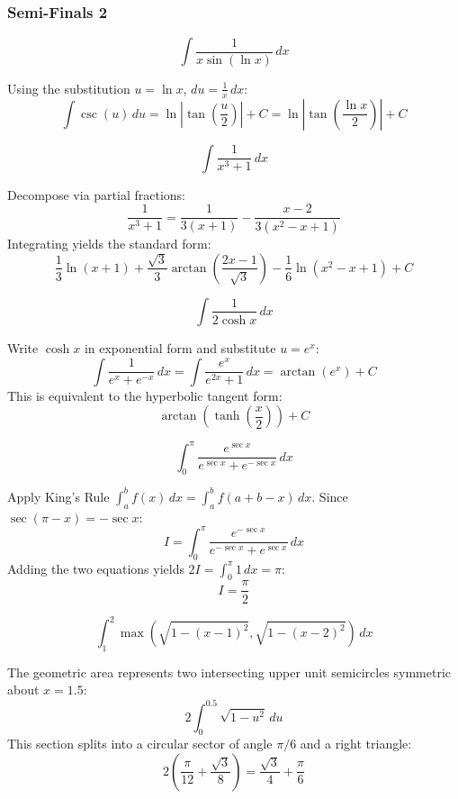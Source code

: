 \subsubsection*{Semi-Finals 2}
\begin{questions}

\question
\[ \int \frac{1}{x \sin(\ln x)} \,dx \]
\begin{solution}
Using the substitution $u = \ln x$, $du = \frac{1}{x} \,dx$:
\[ \int \csc(u) \,du = \ln\left|\tan\left(\frac{u}{2}\right)\right| + C = \ln\left|\tan\left(\frac{\ln x}{2}\right)\right| + C \]
\end{solution}

\question
\[ \int \frac{1}{x^3+1} \,dx \]
\begin{solution}
Decompose via partial fractions:
\[ \frac{1}{x^3+1} = \frac{1}{3(x+1)} - \frac{x-2}{3(x^2-x+1)} \]
Integrating yields the standard form:
\[ \frac{1}{3}\ln(x+1) + \frac{\sqrt{3}}{3}\arctan\left(\frac{2x-1}{\sqrt{3}}\right) - \frac{1}{6}\ln(x^2-x+1) + C \]
\end{solution}

\question
\[ \int \frac{1}{2\cosh x} \,dx \]
\begin{solution}
Write $\cosh x$ in exponential form and substitute $u = e^x$:
\[ \int \frac{1}{e^x + e^{-x}} \,dx = \int \frac{e^x}{e^{2x} + 1} \,dx = \arctan(e^x) + C \]
This is equivalent to the hyperbolic tangent form:
\[ \arctan\left(\tanh\left(\frac{x}{2}\right)\right) + C \]
\end{solution}

\question
\[ \int_0^\pi \frac{e^{\sec x}}{e^{\sec x} + e^{-\sec x}} \,dx \]
\begin{solution}
Apply King's Rule $\int_a^b f(x) \,dx = \int_a^b f(a+b-x) \,dx$. Since $\sec(\pi - x) = -\sec x$:
\[ I = \int_0^\pi \frac{e^{-\sec x}}{e^{-\sec x} + e^{\sec x}} \,dx \]
Adding the two equations yields $2I = \int_0^\pi 1 \,dx = \pi$:
\[ I = \frac{\pi}{2} \]
\end{solution}

\question
\[ \int_1^2 \max\left(\sqrt{1-(x-1)^2}, \sqrt{1-(x-2)^2}\right) \,dx \]
\begin{solution}
The geometric area represents two intersecting upper unit semicircles symmetric about $x = 1.5$:
\[ 2 \int_0^{0.5} \sqrt{1-u^2} \,du \]
This section splits into a circular sector of angle $\pi/6$ and a right triangle:
\[ 2 \left( \frac{\pi}{12} + \frac{\sqrt{3}}{8} \right) = \frac{\sqrt{3}}{4} + \frac{\pi}{6} \]
\end{solution}


\end{questions}
